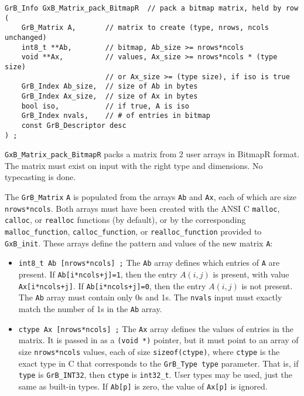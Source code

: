 \documentclass[12pt]{article}
\begin{document}
{\begin{mdframed}[userdefinedwidth=6in]
{\footnotesize
\begin{verbatim}
GrB_Info GxB_Matrix_pack_BitmapR  // pack a bitmap matrix, held by row
(
    GrB_Matrix A,       // matrix to create (type, nrows, ncols unchanged)
    int8_t **Ab,        // bitmap, Ab_size >= nrows*ncols
    void **Ax,          // values, Ax_size >= nrows*ncols * (type size)
                        // or Ax_size >= (type size), if iso is true
    GrB_Index Ab_size,  // size of Ab in bytes
    GrB_Index Ax_size,  // size of Ax in bytes
    bool iso,           // if true, A is iso
    GrB_Index nvals,    // # of entries in bitmap
    const GrB_Descriptor desc
) ;
\end{verbatim}
} \end{mdframed}

\verb'GxB_Matrix_pack_BitmapR' packs a matrix from 2 user arrays in BitmapR
format.
The matrix must exist on input with the right type and dimensions.  No typecasting is done.

The \verb'GrB_Matrix' \verb'A' is populated from the arrays \verb'Ab' and
\verb'Ax', each of which are size \verb'nrows*ncols'.  Both arrays must have
been created with the ANSI C \verb'malloc', \verb'calloc', or \verb'realloc'
functions (by default), or by the corresponding \verb'malloc_function',
\verb'calloc_function', or \verb'realloc_function' provided to \verb'GxB_init'.
These arrays define the pattern and values of the new matrix \verb'A':

\begin{itemize}
\item \verb'int8_t Ab [nrows*ncols] ;'  The \verb'Ab' array defines which
entries of \verb'A' are present.  If \verb'Ab[i*ncols+j]=1', then the entry
$A(i,j)$ is present, with value \verb'Ax[i*ncols+j]'.  If
\verb'Ab[i*ncols+j]=0', then the entry $A(i,j)$ is not present.  The \verb'Ab'
array must contain only 0s and 1s.  The \verb'nvals' input must exactly match
the number of 1s in the \verb'Ab' array.

\item \verb'ctype Ax [nrows*ncols] ;'  The \verb'Ax' array defines the values
of entries in the matrix.  It is passed in as a \verb'(void *)' pointer, but it
must point to an array of size \verb'nrows*ncols' values, each of size
\verb'sizeof(ctype)', where \verb'ctype' is the exact type in C that
corresponds to the \verb'GrB_Type type' parameter.  That is, if \verb'type' is
\verb'GrB_INT32', then \verb'ctype' is \verb'int32_t'.  User types may be used,
just the same as built-in types.
If \verb'Ab[p]' is zero, the value of \verb'Ax[p]' is ignored.


\end{itemize}}
\end{document}
